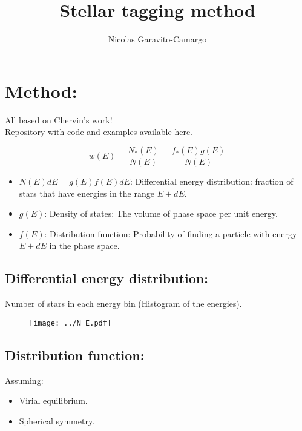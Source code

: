 \documentclass[14pt]{article}
\title{Stellar tagging method}
\author{Nicolas Garavito-Camargo}
\begin{document}
\maketitle

\section{Method:}

All based on Chervin's work!\\

Repository with code and examples available \href{https://github.com/jngaravitoc/tracers_triaxial}{here}.

\begin{equation}
  w(E) = \dfrac{N_*(E)}{N(E)} = \dfrac{f_*(E)g(E)}{N(E)}
\end{equation}

\begin{itemize}
  \item $N(E)dE = g(E)f(E)dE$: Differential energy distribution: fraction of stars
    that have energies in the range $E+dE$.
  \item $g(E)$: Density of states: The volume of phase space per unit energy.
  \item $f(E)$: Distribution function: Probability of finding a particle with
    energy $E+dE$ in the phase space. 
\end{itemize}

\subsection{Differential energy distribution:}

Number of stars in each energy bin (Histogram of the energies).

\begin{figure}[H]
  \centering
  \texttt{[image: ../N\_E.pdf]}
\end{figure}


\subsection{Distribution function:}


Assuming:

\begin{itemize}
  \item Virial equilibrium.
  \item Spherical symmetry.  
\end{itemize}
\end{document}
